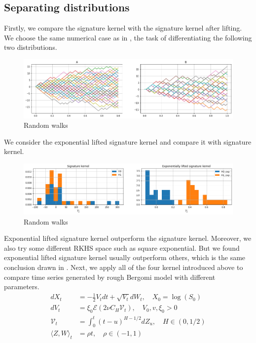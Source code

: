 \documentclass[12pt]{report}
\theoremstyle{definition}
\theoremstyle{remark}
\begin{document}
\subsection{Separating distributions}
Firstly, we compare the signature kernel with the signature kernel after lifting. We choose the same numerical case as in \cite{chevyrev2018signature}, the task of differentiating the following two distributions. 
 \begin{figure}[H]
    \centering
    \includegraphics[width=\textwidth]{figs/estimation1.png}
    \caption{Random walks}
\end{figure}
We consider the exponential lifted signature kernel and compare it with signature kernel. 
 \begin{figure}[H]
    \centering
    \includegraphics[width=\textwidth]{figs/estimation2.png}
    \caption{Random walks}
\end{figure}
Exponential lifted signature kernel outperform the signature kernel. Moreover, we also try some different RKHS space such as square exponential. But we found exponential lifted signature kernel usually outperform others, which is the same conclusion drawn in \cite{chevyrev2018signature}. Next, we apply all of the four kernel introduced above to compare time series generated by rough Bergomi model with different parameters. 
\begin{equation}
  \begin{split}
    dX_{t} &= -\frac{1}{2}V_{t}dt + \sqrt{V_{t}}dW_{t}, \quad X_{0} = \log(S_{0})\\
    dV_{t} &= \xi_{0}\mathcal{E}(2\nu C_{H}\mathcal{V}_{t}),\quad V_{0}, v, \xi_{0} > 0\\
    \mathcal{V}_{t} &= \int_{0}^{t}(t-u)^{H - 1/2}dZ_{u},\quad H \in (0,1/2)\\
    \langle Z, W \rangle_{t} &= \rho t, \quad \rho \in (-1,1)
  \end{split}
\end{equation} 
\end{document}
